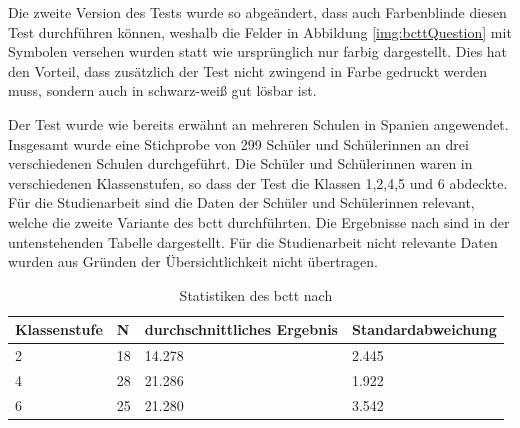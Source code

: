 Die zweite Version des Tests wurde so abgeändert, dass auch Farbenblinde diesen Test durchführen können, weshalb die Felder in Abbildung \ref{img:bcttQuestion} mit Symbolen versehen wurden statt wie ursprünglich nur farbig dargestellt. Dies hat den Vorteil, dass zusätzlich der Test nicht zwingend in Farbe gedruckt werden muss, sondern auch in schwarz-weiß gut lösbar ist. \cite{bcct}

Der Test wurde wie bereits erwähnt an mehreren Schulen in Spanien angewendet. Insgesamt wurde eine Stichprobe von 299 Schüler und Schülerinnen an drei verschiedenen Schulen durchgeführt. Die Schüler und Schülerinnen waren in verschiedenen Klassenstufen, so dass der Test die Klassen 1,2,4,5 und 6 abdeckte. Für die Studienarbeit sind die Daten der Schüler und Schülerinnen relevant, welche die zweite Variante des \acrshort{bctt} durchführten. Die Ergebnisse nach \citeauthor{bcct} sind in der untenstehenden Tabelle dargestellt. Für die Studienarbeit nicht relevante Daten wurden aus Gründen der Übersichtlichkeit nicht übertragen.

\begin{table}[H]
	\centering
	\begin{tabular}{|l|l|l|l|}
		\hline
		\rowcolor[HTML]{C0C0C0} 
		Klassenstufe & N  & durchschnittliches Ergebnis & Standardabweichung \\ \hline
		2            & 18 & 14.278                      & 2.445              \\ \hline
		4            & 28 & 21.286                      & 1.922              \\ \hline
		6            & 25 & 21.280                      & 3.542              \\ \hline
	\end{tabular}
	\caption[Statistiken des \acrshort{bctt}]{Statistiken des \acrshort{bctt} nach \citeauthor{bcct}}
	\label{tab:statisticsBCTT}
\end{table}


